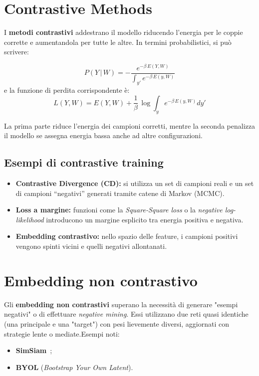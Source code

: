 \section{Contrastive Methods}

I \textbf{metodi contrastivi} addestrano il modello riducendo l’energia per le coppie corrette e aumentandola per tutte le altre.
In termini probabilistici, si può scrivere:

\begin{equation}
    P(Y\,|\,W)= -\frac{e^{-\beta\,E(Y,W)}}{\int_{y'}e^{-\beta\,E(y,W)}}
\end{equation}
e la funzione di perdita corrispondente è:
\begin{equation}
    L(Y,W) = E(Y,W) + \frac{1}{\beta}\,\log\int_ye^{-\beta\,E(y,W)}dy'
\end{equation}

La prima parte riduce l’energia dei campioni corretti, mentre la seconda penalizza il modello se assegna energia bassa anche ad altre configurazioni.

\subsection{Esempi di contrastive training}
\begin{itemize}
    \item \textbf{Contrastive Divergence (CD):} si utilizza un set di campioni reali e un set di campioni “negativi” generati tramite catene di Markov (MCMC).
    \item \textbf{Loss a margine:} funzioni come la \textit{Square-Square loss} o la \textit{negative log-likelihood} introducono un margine esplicito tra energia positiva e negativa.
    \item \textbf{Embedding contrastivo:} nello spazio delle feature, i campioni positivi vengono spinti vicini e quelli negativi allontanati.
\end{itemize}

\section{Embedding non contrastivo}

Gli \textbf{embedding non contrastivi} superano la necessità di generare "esempi negativi" o di effettuare \textit{negative mining}.
Essi utilizzano due reti quasi identiche (una principale e una "target") con pesi lievemente diversi, aggiornati con strategie lente o mediate.Esempi noti:
\begin{itemize}
    \item \textbf{SimSiam}~\cite{chen2021simsiam};
    \item \textbf{BYOL} (\textit{Bootstrap Your Own Latent}).
\end{itemize}

